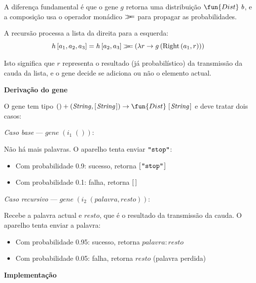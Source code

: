 \documentclass[11pt, a4paper, fleqn]{article}
\newcommand{\Conid}[1]{\mathit{#1}}
\newcommand{\Varid}[1]{\mathit{#1}}
\newcommand{\bind}{\mathbin{>\!\!\!>\mkern-6.7mu=}}
\begin{document}
A diferença fundamental é que o gene \ensuremath{\Varid{g}} retorna uma distribuição \ensuremath{\fun{Dist}\;\Varid{b}},
e a composição usa o operador monádico \ensuremath{\bind } para propagar as probabilidades.

A recursão processa a lista da direita para a esquerda:
\begin{displaymath}
h\,[a_1, a_2, a_3] = h\,[a_2, a_3] \bind (\lambda r \to g\,(\text{Right}\,(a_1, r)))
\end{displaymath}

Isto significa que \ensuremath{\Varid{r}} representa o resultado (já probabilístico) da transmissão
da cauda da lista, e o gene decide se adiciona ou não o elemento actual.

\textbf{Derivação do gene}

O gene tem tipo \ensuremath{()+(\Conid{String},[\mskip1.5mu \Conid{String}\mskip1.5mu])\to \fun{Dist}\;[\mskip1.5mu \Conid{String}\mskip1.5mu]} e deve tratar dois casos:

\emph{Caso base} — \ensuremath{\Varid{gene}\;(i_1\;())}:

Não há mais palavras. O aparelho tenta enviar \ensuremath{\text{\ttfamily \char34 stop\char34}}:
\begin{itemize}
    \item Com probabilidade 0.9: sucesso, retorna \ensuremath{[\mskip1.5mu \text{\ttfamily \char34 stop\char34}\mskip1.5mu]}
    \item Com probabilidade 0.1: falha, retorna \ensuremath{[\mskip1.5mu \mskip1.5mu]}
\end{itemize}

\emph{Caso recursivo} — \ensuremath{\Varid{gene}\;(i_2\;(\Varid{palavra},\Varid{resto}))}:

Recebe a palavra actual e \ensuremath{\Varid{resto}}, que é o resultado da transmissão da cauda.
O aparelho tenta enviar a palavra:
\begin{itemize}
    \item Com probabilidade 0.95: sucesso, retorna \ensuremath{\Varid{palavra}\mathbin{:}\Varid{resto}}
    \item Com probabilidade 0.05: falha, retorna \ensuremath{\Varid{resto}} (palavra perdida)
\end{itemize}

\textbf{Implementação}
\end{document}
